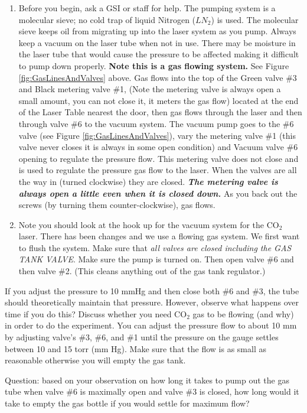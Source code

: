 \documentclass{../lab}
\begin{document}
\begin{enumerate}
    \item Before you begin, ask a GSI or staff for help. The pumping system is a molecular sieve; no cold trap of liquid Nitrogen ($LN_2$) is used. The molecular sieve keeps oil from migrating up into the laser system as you pump. Always keep a vacuum on the laser tube when not in use. There may be moisture in the laser tube that would cause the pressure to be affected making it difficult to pump down properly. \textbf{Note this is a gas flowing system.} See Figure \ref{fig:GasLinesAndValves} above. Gas flows into the top of the Green valve \#3 and Black metering valve \#1, (Note the metering valve is always open a small amount, you can not close it, it meters the gas flow) located at the end of the Laser Table nearest the door, then gas flows through the laser and then through valve \#6 to the vacuum system. The vacuum pump goes to the \#6 valve (see Figure \ref{fig:GasLinesAndValves}), vary the metering valve \#1 (this valve never closes it is always in some open condition) and Vacuum valve \#6 opening to regulate the pressure flow. This metering valve does not close and is used to regulate the pressure gas flow to the laser. When the valves are all the way in (turned clockwise) they are closed. \emph{\textbf{The metering valve is always open a little even when it is closed down.}} As you back out the screws (by turning them counter-clockwise), gas flows.

    \item Note you should look at the hook up for the vacuum system for the CO$_2$ laser. There has been changes and we use a flowing gas system. We first want to flush the system. Make sure that \emph{all valves are closed including the GAS TANK VALVE}. Make sure the pump is turned on. Then open valve \#6 and then valve \#2. (This cleans anything out of the gas tank regulator.)
\end{enumerate}

If you adjust the pressure to 10 mmHg and then close both \#6 and \#3, the tube should theoretically maintain that pressure. However, observe what happens over time if you do this? Discuss whether you need CO$_2$ gas to be flowing (and why) in order to do the experiment. You can adjust the pressure flow to about 10 mm by adjusting valve's \#3, \#6, and \#1 until the pressure on the gauge settles between 10 and 15 torr (mm Hg). Make sure that the flow is as small as reasonable otherwise you will empty the gas tank.

Question: based on your observation on how long it takes to pump out the gas tube when valve \#6 is maximally open and valve \#3 is closed, how long would it take to empty the gas bottle if you would settle for maximum flow?
\end{document}
